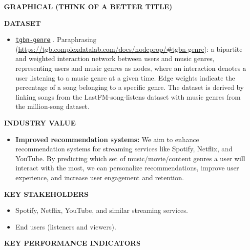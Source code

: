 \documentclass[10pt, letterpaper]{article}
\renewcommand{\title}[1]{%
	\begin{center}
		{\Large \bfseries \uppercase{#1}}
	\end{center}
}
\renewcommand{\section}[1]{%
	    \vspace{\parskip}
		{\large \bfseries\uppercase{#1}}
}
\newcommand{\itemTitle}[1]{%
	{\bfseries{#1}}
}
\begin{document}
	
\title{Graphical (think of a better title)}
	
\section{Dataset}
	
\begin{itemize}
\item 
\href{https://github.com/shenyangHuang/TGB/blob/main/tgb/datasets/dataset_scripts/tgbn-genre.py}{\tt{tgbn-genre}} \cite{tgbn-genre}. Paraphrasing \cite{H_web:2023} (\url{https://tgb.complexdatalab.com/docs/nodeprop/#tgbn-genre}): a bipartite and weighted interaction network between users and music genres, representing users and music genres as nodes, where an interaction denotes a user listening to a music genre at a given time. Edge weights indicate the percentage of a song belonging to a specific genre. The dataset is derived by linking songs from the LastFM-song-listens dataset with music genres from the million-song dataset. 

\end{itemize}
	
\section{Industry value}

\begin{itemize}
\item \itemTitle{Improved recommendation systems:} We aim to enhance recommendation systems for streaming services like Spotify, Netflix, and YouTube. By predicting which set of music/movie/content genres a user will interact with the most, we can personalize recommendations, improve user experience, and increase user engagement and retention.
\end{itemize}
	
\section{Key Stakeholders}
\begin{itemize}
\item Spotify, Netflix, YouTube, and similar streaming services.
\item End users (listeners and viewers).
\end{itemize}
	
\section{Key Performance Indicators}
\end{document}
